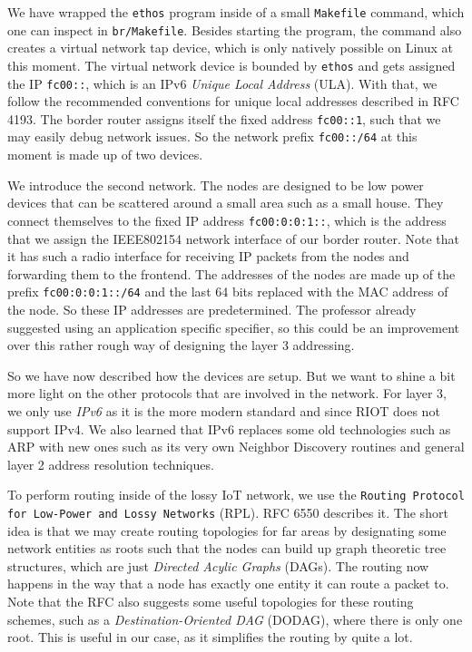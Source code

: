 \documentclass[acmtog, language=english, nonacm]{acmart}
\begin{document}
    We have wrapped the \texttt{ethos} program inside of a small \texttt{Makefile} command, which one can inspect in \texttt{br/Makefile}. Besides starting the program, the command also creates a virtual network tap device, which is only natively possible on Linux at this moment. The virtual network device is bounded by \texttt{ethos} and gets assigned the IP \texttt{fc00::}, which is an IPv6 \emph{Unique Local Address} (ULA). With that, we follow the recommended conventions for unique local addresses described in RFC 4193. The border router assigns itself the fixed address \texttt{fc00::1}, such that we may easily debug network issues. So the network prefix \texttt{fc00::/64} at this moment is made up of two devices.

    We introduce the second network. The nodes are designed to be low power devices that can be scattered around a small area such as a small house. They connect themselves to the fixed IP address \texttt{fc00:0:0:1::}, which is the address that we assign the IEEE802154 network interface of our border router. Note that it has such a radio interface for receiving IP packets from the nodes and forwarding them to the frontend. The addresses of the nodes are made up of the prefix \texttt{fc00:0:0:1::/64} and the last 64 bits replaced with the MAC address of the node. So these IP addresses are predetermined. The professor already suggested using an application specific specifier, so this could be an improvement over this rather rough way of designing the layer 3 addressing.

    So we have now described how the devices are setup. But we want to shine a bit more light on the other protocols that are involved in the network. For layer 3, we only use \emph{IPv6} as it is the more modern standard and since RIOT does not support IPv4. We also learned that IPv6 replaces some old technologies such as ARP with new ones such as its very own Neighbor Discovery routines and general layer 2 address resolution techniques.
    
    To perform routing inside of the lossy IoT network, we use the \texttt{Routing Protocol for Low-Power and Lossy Networks} (RPL). RFC 6550 describes it. The short idea is that we may create routing topologies for far areas by designating some network entities as roots such that the nodes can build up graph theoretic tree structures, which are just \emph{Directed Acylic Graphs} (DAGs). The routing now happens in the way that a node has exactly one entity it can route a packet to. Note that the RFC also suggests some useful topologies for these routing schemes, such as a \emph{Destination-Oriented DAG} (DODAG), where there is only one root. This is useful in our case, as it simplifies the routing by quite a lot.
\end{document}
